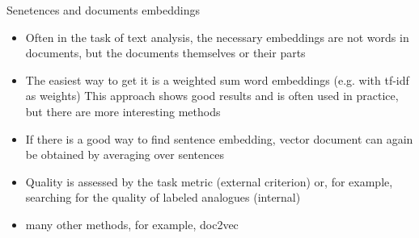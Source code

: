 \documentclass[svgnames]{beamer}
\begin{document}
    \begin{frame}{Senetences and documents embeddings}
        \begin{itemize}
            \item Often in the task of text analysis, the necessary embeddings are not words in documents, but the documents themselves or their parts
            \item The easiest way to get it is a weighted sum word embeddings (e.g. with tf-idf as weights)
            This approach shows good results and is often used
            in practice, but there are more interesting methods
            \item If there is a good way to find sentence embedding, vector
            document can again be obtained by averaging over
            sentences
            \item Quality is assessed by the task metric (external criterion) or,
            for example, searching for the quality of labeled analogues (internal)
            \item many other methods, for example, doc2vec
        \end{itemize}
    \end{frame}
\end{document}

